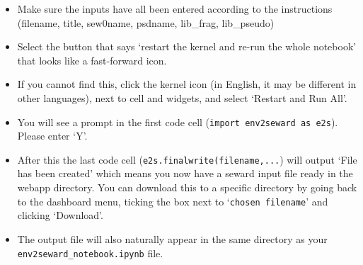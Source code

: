 \begin{itemize}
	\item Make sure the inputs have all been entered according to the instructions (filename, title, sew0name, psdname, lib\_frag, lib\_pseudo)
	\item Select the button that says `restart the kernel and re-run the whole notebook' that looks like a fast-forward icon.
	\item If you cannot find this, click the kernel icon (in English, it may be different in other languages), next to cell and widgets, and select `Restart and Run All'.
	\item You will see a prompt in the first code cell (\texttt{import env2seward as e2s}). Please enter `Y'.
	\item After this the last code cell (\texttt{e2s.finalwrite(filename,...}) will output `File has been created' which means you now have a seward input file ready in the webapp directory. You can download this to a specific directory by going back to the dashboard menu, ticking the box next to `\texttt{chosen filename}' and clicking `Download'.
	\item The output file will also naturally appear in the same directory as your \texttt{env2seward\_notebook.ipynb} file.
        \end{itemize}

